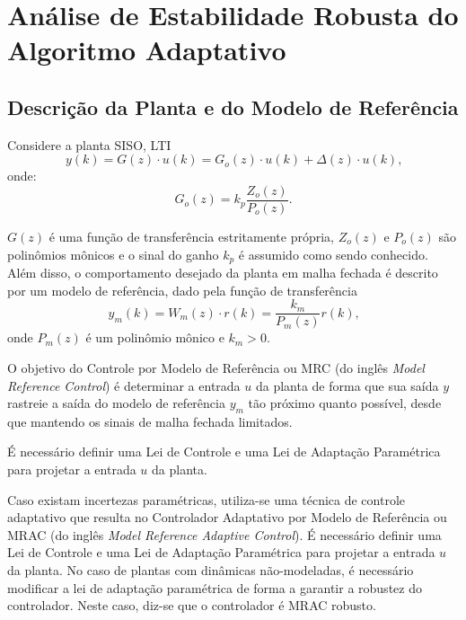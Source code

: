 
\chapter[Análise de Estabilidade do Alg. Adaptativo]{Análise de Estabilidade
    Robusta do Algoritmo Adaptativo}\label{provas}

\section{Descrição da Planta e do Modelo de Referência}

    Considere a planta SISO, LTI
    \begin{equation}
        y(k) = G(z) \cdot u(k) = G_o(z) \cdot u(k) + \Delta(z) \cdot u(k)\text{,}
        \label{eq:saida_da_planta}
    \end{equation}
    onde:
    \begin{equation}
        G_o(z) = k_p \frac{Z_o(z)}{P_o(z)}\text{.}
    \end{equation}

    $G(z)$ é uma função de transferência estritamente própria, $Z_o(z)$ e $P_o(z)$
    são polinômios mônicos e o sinal do ganho $k_p$ é assumido como sendo conhecido. Além
    disso, o comportamento desejado da planta em malha fechada é descrito por um modelo de
    referência, dado pela função de transferência
    \begin{equation}
        y_m(k) = W_m(z) \cdot r(k) = \frac{k_m}{P_m(z)} r(k)\text{,}
        \label{eq:saida_do_modelo_de_referencia}
    \end{equation}
    onde $P_m(z)$ é um polinômio mônico e $k_m > 0$.

    O objetivo do Controle por Modelo de Referência ou MRC (do inglês \emph{Model
    Reference Control}) é determinar a entrada $u$ da planta de forma que sua saída
    $y$ rastreie a saída do modelo de referência $y_m$ tão próximo quanto possível,
    desde que mantendo os sinais de malha fechada limitados.

    É necessário definir uma Lei de Controle e uma Lei de Adaptação Paramétrica para
    projetar a entrada $u$ da planta.

    Caso existam incertezas paramétricas, utiliza-se uma técnica de controle adaptativo
    que resulta no Controlador Adaptativo por Modelo de Referência ou MRAC (do inglês
    \emph{Model Reference Adaptive Control}). É necessário definir uma Lei de Controle
    e uma Lei de Adaptação Paramétrica para projetar a entrada $u$ da planta. No caso de
    plantas com dinâmicas não-modeladas, é necessário modificar a lei de adaptação
    paramétrica de forma a garantir a robustez do controlador. Neste caso, diz-se que o
    controlador é MRAC robusto.

